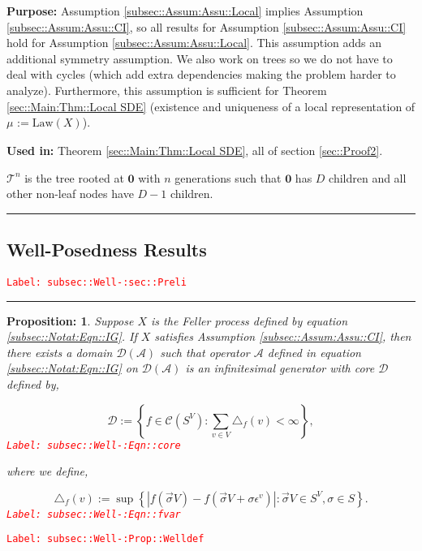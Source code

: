 \documentclass[12pt]{article}
\newcommand{\mc}{\mathcal}
\newcommand{\te}{\text}
\newcommand{\ep}{\epsilon}
\newcommand{\tr}{\textcolor{red}}
\newcommand{\labe}[1]{\tr{\texttt{Label: #1}}}
\newcommand{\purpose}{\textbf{Purpose: }}
\newcommand{\usein}{\textbf{Used in: }}
\newcommand{\ind}{\hspace{24pt}}
\newcommand{\lin}{\rule{\linewidth}{0.4 pt}}
\newcommand{\defeq}{:=}								%
\renewcommand{\root}{\mathbf{0}}				%
\renewcommand{\v}{v}							%
\renewcommand{\S}{S}							%
\newcommand{\s}{\sigma}							%
\newcommand{\sv}{\vec{\s}}						%
\newcommand{\ev}[1]{\ep^{#1}}					%
\newcommand{\X}{X}								%
\newcommand{\IG}{\mc{A}}						%
\newcommand{\degr}{D}								%
\newcommand{\law}{\te{Law}}							%
\newcommand{\tree}{\mc{T}}							%
\newcommand{\core}{\mc{D}}							%
\newcommand{\numb}{n}								%
\newcommand{\XState}[1]{\S^{#1}}				%
\newcommand{\m}[3]{\mu_{#2#1}^{#3}}						%
\newcommand{\cont}{\mc{C}}							%
\newtheorem{prop}[thms]{Proposition: }
\begin{document}
\purpose Assumption \ref{subsec::Assum:Assu::Local} implies Assumption \ref{subsec::Assum:Assu::CI}, so all results for Assumption \ref{subsec::Assum:Assu::CI} hold for Assumption \ref{subsec::Assum:Assu::Local}. This assumption adds an additional symmetry assumption. We also work on trees so we do not have to deal with cycles (which add extra dependencies making the problem harder to analyze). Furthermore, this assumption is sufficient for Theorem \ref{sec::Main:Thm::Local SDE} (existence and uniqueness of a local representation of \(\m{}{}{} \defeq \law(\X{}{})\)).

\usein Theorem \ref{sec::Main:Thm::Local SDE}, all of section \ref{sec::Proof2}.

\ind \(\tree^\numb\) is the tree rooted at \(\root\) with \(\numb\) generations such that \(\root\) has \(\degr\) children and all other non-leaf nodes have \(\degr-1\) children.

\lin

\subsection{Well-Posedness Results}
\label{subsec::Well-:sec::Preli}\labe{subsec::Well-:sec::Preli}

\rule{\linewidth}{0.4 pt}

\begin{prop}
Suppose \(\X{}{}\) is the Feller process defined by equation \eqref{subsec::Notat:Eqn::IG}. If \(\X{}{}\) satisfies Assumption \ref{subsec::Assum:Assu::CI}, then there exists a domain \(\core(\IG)\) such that operator \(\IG\) defined in equation \eqref{subsec::Notat:Eqn::IG} on \(\mc{D}(\IG)\) is an infinitesimal generator with core \(\core\) defined by,

\begin{equation}
\core \defeq \left\{f \in \cont(\S^ V): \sum_{\v\in V} \triangle_f(\v) < \infty\right\},
\label{subsec::Well-:Eqn::core}
\end{equation}
\labe{subsec::Well-:Eqn::core}

where we define,

\begin{equation}
\triangle_f(\v) \defeq \sup\left\{|f(\sv{}{ V}) - f(\sv{}{ V}+\s\ev{\v})|: \sv{}{ V} \in \S^ V,\s \in \S\right\}.
\label{subsec::Well-:Eqn::fvar}
\end{equation}
\labe{subsec::Well-:Eqn::fvar}

\label{subsec::Well-:Prop::Welldef}
\end{prop}
\labe{subsec::Well-:Prop::Welldef}
\end{document}
